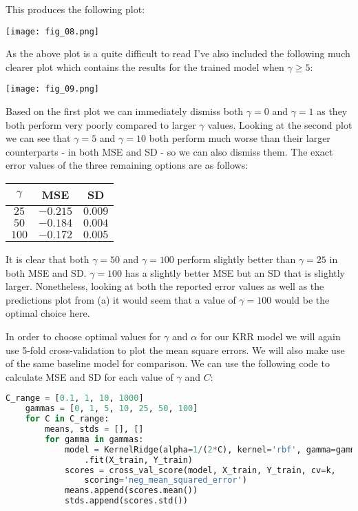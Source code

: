\documentclass[12pt]{article}
\begin{document}
This produces the following plot:

\begin{center}
    \texttt{[image: fig\_08.png]}
\end{center}

As the above plot is a quite difficult to read I've also included the following much clearer plot which contains the results for the trained model when $\gamma \ge 5$:

\begin{center}
    \texttt{[image: fig\_09.png]}
\end{center}

Based on the first plot we can immediately dismiss both $\gamma = 0$ and $\gamma = 1$ as they both perform very poorly compared to larger $\gamma$ values. Looking at the second plot we can see that $\gamma = 5$ and $\gamma = 10$ both perform much worse than their larger counterparts - in both MSE and SD - so we can also dismiss them. The exact error values of the three remaining options are as follows:

\begin{center}
    \begin{tabular}{|c|c|c|}
        \hline
        $\gamma$ & MSE & SD \\
        \hline
        $25$ & $-0.215$ & $0.009$ \\
        $50$ & $-0.184$ & $0.004$ \\
        $100$ & $-0.172$ & $0.005$ \\
        \hline
    \end{tabular}
\end{center}

It is clear that both $\gamma = 50$ and $\gamma = 100$ perform slightly better than $\gamma = 25$ in both MSE and SD. $\gamma = 100$ has a slightly better MSE but an SD that is slightly larger. Nonetheless, looking at both the reported error values as well as the predictions plot from (a) it would seem that a value of $\gamma = 100$ would be the optimal choice here.

In order to choose optimal values for $\gamma$ and $\alpha$ for our KRR model we will again use 5-fold cross-validation to plot the mean square errors. We will also make use of the same baseline model for comparison. We can use the following code to calculate MSE and SD for each value of $\gamma$ and $C$:

\begin{center}
    \lstset{basicstyle=\footnotesize}
    \begin{lstlisting}[language=Python]
    C_range = [0.1, 1, 10, 1000]
    gammas = [0, 1, 5, 10, 25, 50, 100]
    for C in C_range:
        means, stds = [], []
        for gamma in gammas:
            model = KernelRidge(alpha=1/(2*C), kernel='rbf', gamma=gamma)
                .fit(X_train, Y_train)
            scores = cross_val_score(model, X_train, Y_train, cv=k,
                scoring='neg_mean_squared_error')
            means.append(scores.mean())
            stds.append(scores.std())
    \end{lstlisting}
\end{center}
\end{document}
